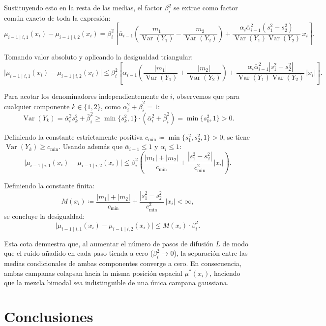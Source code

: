 \documentclass[11pt,a4paper]{article}
\DeclareMathOperator{\Var}{Var}
\begin{document}
Sustituyendo esto en la resta de las medias, el factor $\beta_i^2$ se extrae como factor común exacto de toda la expresión:
\[
\mu_{i-1\mid i, 1}(x_i) - \mu_{i-1\mid i, 2}(x_i) = \beta_i^2 \left[ \bar{\alpha}_{i-1} \left( \frac{m_1}{\Var(Y_1)} - \frac{m_2}{\Var(Y_2)} \right) + \frac{\alpha_i \bar{\alpha}_{i-1}^2 (s_1^2 - s_2^2)}{\Var(Y_1)\Var(Y_2)}\, x_i \right].
\]

Tomando valor absoluto y aplicando la desigualdad triangular:
\[
\big|\mu_{i-1\mid i, 1}(x_i) - \mu_{i-1\mid i, 2}(x_i)\big| \le \beta_i^2 \left[ \bar{\alpha}_{i-1} \left( \frac{|m_1|}{\Var(Y_1)} + \frac{|m_2|}{\Var(Y_2)} \right) + \frac{\alpha_i \bar{\alpha}_{i-1}^2 |s_1^2 - s_2^2|}{\Var(Y_1)\Var(Y_2)}\, |x_i| \right].
\]

Para acotar los denominadores independientemente de $i$, observemos que para cualquier componente $k \in \{1, 2\}$, como $\bar{\alpha}_i^2 + \bar{\beta}_i^2 = 1$:
\[
\Var(Y_k) = \bar{\alpha}_i^2 s_k^2 + \bar{\beta}_i^2 \ge \min\{s_k^2, 1\} \cdot (\bar{\alpha}_i^2 + \bar{\beta}_i^2) = \min\{s_k^2, 1\} > 0.
\]

Definiendo la constante estrictamente positiva $c_{\min} \coloneqq \min\{s_1^2, s_2^2, 1\} > 0$, se tiene $\Var(Y_k) \ge c_{\min}$. Usando además que $\bar{\alpha}_{i-1} \le 1$ y $\alpha_i \le 1$:
\[
\big|\mu_{i-1\mid i, 1}(x_i) - \mu_{i-1\mid i, 2}(x_i)\big| \le \beta_i^2 \left( \frac{|m_1| + |m_2|}{c_{\min}} + \frac{|s_1^2 - s_2^2|}{c_{\min}^2}\, |x_i| \right).
\]

Definiendo la constante finita:
\[
M(x_i) \coloneqq \frac{|m_1| + |m_2|}{c_{\min}} + \frac{|s_1^2 - s_2^2|}{c_{\min}^2}\, |x_i| < \infty,
\]
se concluye la desigualdad:
\[
\big|\mu_{i-1\mid i, 1}(x_i) - \mu_{i-1\mid i, 2}(x_i)\big| \le M(x_i) \cdot \beta_i^2.
\]

Esta cota demuestra que, al aumentar el número de pasos de difusión $L$ de modo que el ruido añadido en cada paso tienda a cero ($\beta_i^2 \to 0$), la separación entre las medias condicionales de ambas componentes converge a cero. En consecuencia, ambas campanas colapsan hacia la misma posición espacial $\mu^*(x_i)$, haciendo que la mezcla bimodal sea indistinguible de una única campana gaussiana.

\section{Conclusiones}
\end{document}
